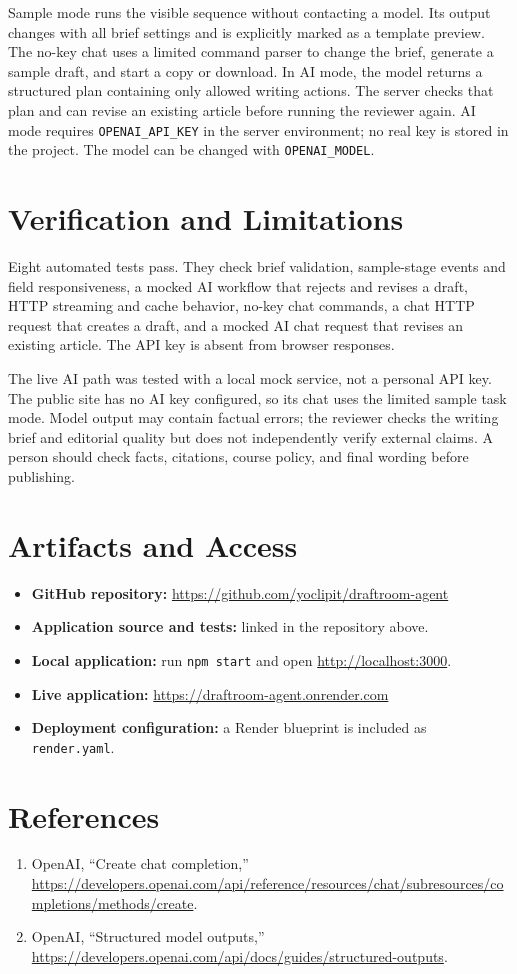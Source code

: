 \documentclass[10pt,letterpaper]{article}
\begin{document}
Sample mode runs the visible sequence without contacting a model. Its output changes with all brief settings and is explicitly marked as a template preview. The no-key chat uses a limited command parser to change the brief, generate a sample draft, and start a copy or download. In AI mode, the model returns a structured plan containing only allowed writing actions. The server checks that plan and can revise an existing article before running the reviewer again. AI mode requires \texttt{OPENAI\_API\_KEY} in the server environment; no real key is stored in the project. The model can be changed with \texttt{OPENAI\_MODEL}.

\section{Verification and Limitations}
Eight automated tests pass. They check brief validation, sample-stage events and field responsiveness, a mocked AI workflow that rejects and revises a draft, HTTP streaming and cache behavior, no-key chat commands, a chat HTTP request that creates a draft, and a mocked AI chat request that revises an existing article. The API key is absent from browser responses.

The live AI path was tested with a local mock service, not a personal API key. The public site has no AI key configured, so its chat uses the limited sample task mode. Model output may contain factual errors; the reviewer checks the writing brief and editorial quality but does not independently verify external claims. A person should check facts, citations, course policy, and final wording before publishing.

\section{Artifacts and Access}
\begin{itemize}
  \item \textbf{GitHub repository:} \url{https://github.com/yoclipit/draftroom-agent}
  \item \textbf{Application source and tests:} linked in the repository above.
  \item \textbf{Local application:} run \texttt{npm start} and open \url{http://localhost:3000}.
  \item \textbf{Live application:} \url{https://draftroom-agent.onrender.com}
  \item \textbf{Deployment configuration:} a Render blueprint is included as \texttt{render.yaml}.
\end{itemize}

\section*{References}
\begin{enumerate}
  \item OpenAI, ``Create chat completion,'' \url{https://developers.openai.com/api/reference/resources/chat/subresources/completions/methods/create}.
  \item OpenAI, ``Structured model outputs,'' \url{https://developers.openai.com/api/docs/guides/structured-outputs}.
\end{enumerate}
\end{document}
